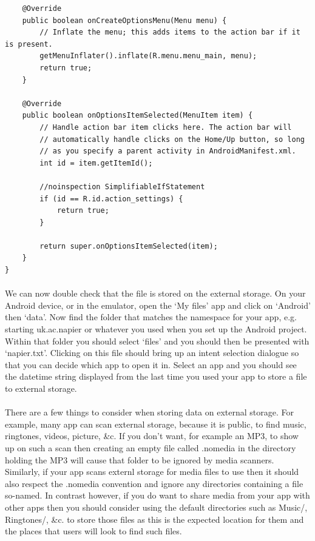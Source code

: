 \begin{lstlisting}
    @Override
    public boolean onCreateOptionsMenu(Menu menu) {
        // Inflate the menu; this adds items to the action bar if it is present.
        getMenuInflater().inflate(R.menu.menu_main, menu);
        return true;
    }

    @Override
    public boolean onOptionsItemSelected(MenuItem item) {
        // Handle action bar item clicks here. The action bar will
        // automatically handle clicks on the Home/Up button, so long
        // as you specify a parent activity in AndroidManifest.xml.
        int id = item.getItemId();

        //noinspection SimplifiableIfStatement
        if (id == R.id.action_settings) {
            return true;
        }

        return super.onOptionsItemSelected(item);
    }
}
\end{lstlisting}

\paragraph{} We can now double check that the file is stored on the external storage. On your Android device, or in the emulator, open the `My files' app and click on `Android' then `data'. Now find the folder that matches the namespace for your app, e.g. starting uk.ac.napier or whatever you used when you set up the Android project. Within that folder you should select `files' and you should then be presented with `napier.txt'. Clicking on this file should bring up an intent selection dialogue so that you can decide which app to open it in. Select an app and you should see the datetime string displayed from the last time you used your app to store a file to external storage.

\paragraph{} There are a few things to consider when storing data on external storage. For example, many app can scan external storage, because it is public, to find music, ringtones, videos, picture, \&c. If you don't want, for example an MP3, to show up on such a scan then creating an empty file called .nomedia in the directory holding the MP3 will cause that folder to be ignored by media scanners. Similarly, if your app scans externl storage for media files to use then it should also respect the .nomedia convention and ignore any directories containing a file so-named. In contrast however, if you do want to share media from your app with other apps then you should consider using the default directories such as Music/, Ringtones/, \&c. to store those files as this is the expected location for them and the places that users will look to find such files.

